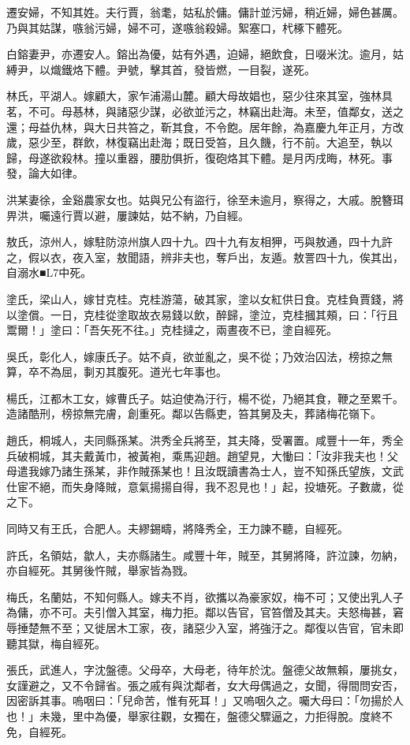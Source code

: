 \begin{pinyinscope}
遷安婦，不知其姓。夫行賈，翁耄，姑私於傭。傭計並污婦，稍近婦，婦色甚厲。乃與其姑謀，嗾翁污婦，婦不可，遂嗾翁殺婦。絮塞口，杙椓下體死。

白鎔妻尹，亦遷安人。鎔出為優，姑有外遇，迫婦，絕飲食，日啜米沈。逾月，姑縛尹，以熾鐵烙下體。尹號，擊其首，發皆燃，一目裂，遂死。

林氏，平湖人。嫁顧大，家乍浦湯山麓。顧大母故娼也，惡少往來其室，強林具茗，不可。母惎林，與諸惡少謀，必欲並污之，林竊出赴海。未至，值鄰女，送之還；母益仇林，與大日共笞之，靳其食，不令飽。居年餘，為嘉慶九年正月，方改歲，惡少至，群飲，林復竊出赴海；既日受笞，且久饑，行不前。大追至，執以歸，母遂欲殺林。撞以重器，腰肋俱折，復砲烙其下體。是月丙戌晦，林死。事發，論大如律。

洪某妻徐，金谿農家女也。姑與兄公有盜行，徐至未逾月，察得之，大戚。脫簪珥畀洪，囑遠行賈以避，屢諫姑，姑不納，乃自經。

敖氏，涼州人，嫁駐防涼州旗人四十九。四十九有友相狎，丐與敖通，四十九許之，假以衣，夜入室，敖聞語，辨非夫也，奪戶出，友遁。敖詈四十九，俟其出，自溺水■L7中死。

塗氏，梁山人，嫁甘克桂。克桂游蕩，破其家，塗以女紅供日食。克桂負賈錢，將以塗償。一日，克桂從塗取故衣易錢以飲，醉歸，塗泣，克桂摑其頰，曰：「行且鬻爾！」塗曰：「吾矢死不往。」克桂撻之，兩晝夜不已，塗自經死。

吳氏，彰化人，嫁康氏子。姑不貞，欲並亂之，吳不從；乃效治囚法，榜掠之無算，卒不為屈，剚刃其腹死。道光七年事也。

楊氏，江都木工女，嫁曹氏子。姑迫使為汙行，楊不從，乃絕其食，鞭之至累千。造諸酷刑，榜掠無完膚，創重死。鄰以告縣吏，笞其舅及夫，葬諸梅花嶺下。

趙氏，桐城人，夫同縣孫某。洪秀全兵將至，其夫降，受署置。咸豐十一年，秀全兵破桐城，其夫戴黃巾，被黃袍，乘馬迎趙。趙望見，大慟曰：「汝非我夫也！父母遣我嫁乃諸生孫某，非作賊孫某也！且汝既讀書為士人，豈不知孫氏望族，文武仕宦不絕，而失身降賊，意氣揚揚自得，我不忍見也！」起，投塘死。子數歲，從之下。

同時又有王氏，合肥人。夫繆錫疇，將降秀全，王力諫不聽，自經死。

許氏，名領姑，歙人，夫亦縣諸生。咸豐十年，賊至，其舅將降，許泣諫，勿納，亦自經死。其舅後忤賊，舉家皆為戮。

梅氏，名蘭姑，不知何縣人。嫁夫不肖，欲攜以為豪家奴，梅不可；又使出乳人子為傭，亦不可。夫引僧入其室，梅力拒。鄰以告官，官笞僧及其夫。夫怒梅甚，窘辱捶楚無不至；又徙居木工家，夜，諸惡少入室，將強汙之。鄰復以告官，官未即聽其獄，梅自經死。

張氏，武進人，字沈盤德。父母卒，大母老，待年於沈。盤德父故無賴，屢挑女，女謹避之，又不令歸省。張之戚有與沈鄰者，女大母偶過之，女聞，得間問安否，因密訴其事。嗚咽曰：「兒命苦，惟有死耳！」又嗚咽久之。囑大母曰：「勿揚於人也！」未幾，里中為優，舉家往觀，女獨在，盤德父驟逼之，力拒得脫。度終不免，自經死。


\end{pinyinscope}
